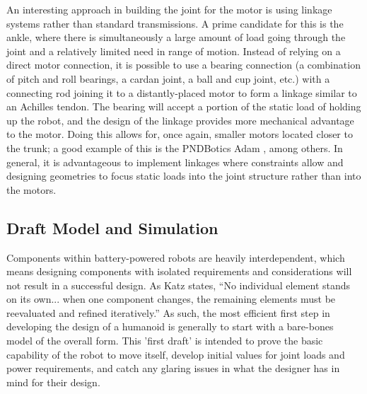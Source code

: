 \documentclass{article}
\begin{document}
An interesting approach in building the joint for the motor is using linkage systems rather than standard transmissions. A prime candidate for this is the ankle, where there is simultaneously a large amount of load going through the joint and a relatively limited need in range of motion. Instead of relying on a direct motor connection, it is possible to use a bearing connection (a combination of pitch and roll bearings, a cardan joint, a ball and cup joint, etc.) with a connecting rod joining it to a distantly-placed motor to form a linkage similar to an Achilles tendon. The bearing will accept a portion of the static load of holding up the robot, and the design of the linkage provides more mechanical advantage to the motor. Doing this allows for, once again, smaller motors located closer to the trunk; a good example of this is the PNDBotics Adam \cite{pndboticsAdam}, among others. In general, it is advantageous to implement linkages where constraints allow and designing geometries to focus static loads into the joint structure rather than into the motors.

\subsection{Draft Model and Simulation}

Components within battery-powered robots are heavily interdependent, which means designing components with isolated requirements and considerations will not result in a successful design. As Katz states, “No individual element stands on its own... when one component changes, the remaining elements must be reevaluated and refined iteratively.” \cite{mckenzie_design_2012}%
As such, the most efficient first step in developing the design of a humanoid is generally to start with a bare-bones model of the overall form. This 'first draft' is intended to prove the basic capability of the robot to move itself, develop initial values for joint loads and power requirements, and catch any glaring issues in what the designer has in mind for their design.
\end{document}
